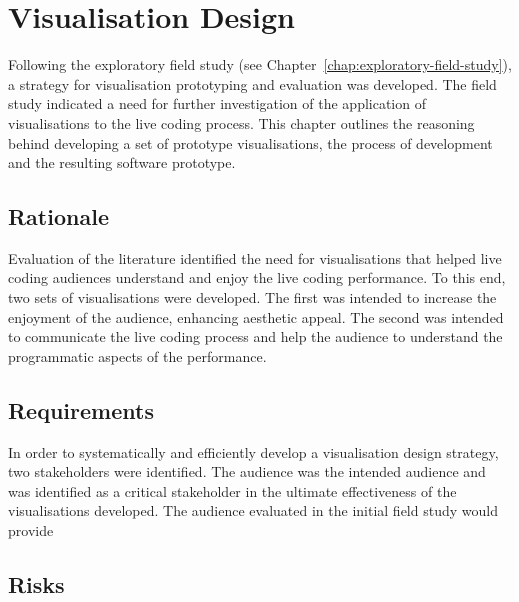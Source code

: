 
\chapter{Visualisation Design}
\label{chap:visualisation-design}

Following the exploratory field study (see Chapter~\ref{chap:exploratory-field-study}), a strategy for visualisation prototyping and evaluation was developed. The field study indicated a need for further investigation of the application of visualisations to the live coding process. This chapter outlines the reasoning behind developing a set of prototype visualisations, the process of development and the resulting software prototype.


\section{Rationale}

Evaluation of the literature identified the need for visualisations that helped live coding audiences understand and enjoy the live coding performance. To this end, two sets of visualisations were developed. The first was intended to increase the enjoyment of the audience, enhancing aesthetic appeal. The second was intended to communicate the live coding process and help the audience to understand the programmatic aspects of the performance.

\section{Requirements}

In order to systematically and efficiently develop a visualisation design strategy, two stakeholders were identified. The audience was the intended audience and was identified as a critical stakeholder in the ultimate effectiveness of the visualisations developed. The audience evaluated in the initial field study would provide 


% 


\section{Risks}


